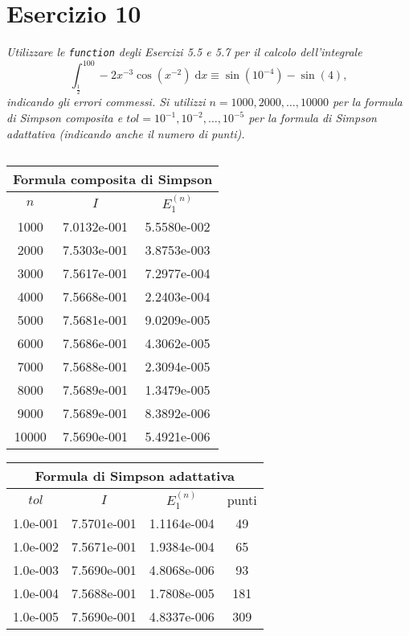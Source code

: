 
\section{Esercizio 10}
\label{sub:es10}
\emph{Utilizzare le \lstinline{function} degli Esercizi 5.5 e 5.7 per il calcolo dell'integrale
      $$\int_{\frac{1}{2}}^{100}-2x^{-3}\cos\left(x^{-2}\right)\;\mathrm{d}x\equiv\sin\left(10^{-4}\right)-\sin(4),$$
			indicando gli errori commessi.
      Si utilizzi $n=1000,2000,\dots,10000$ per la formula di Simpson composita e
      $tol=10^{-1},10^{-2},\dots,10^{-5}$ per la formula di Simpson adattativa (indicando anche il numero di punti).}
\begin{sol}
	
	\normalfont
	$ $\\
	\begin{center}\begin{tabular}{c|c|c}
	\hline\multicolumn{3}{c}{Formula composita di Simpson}\\\hline
	$n$ & $I$ & $E_1^{(n)}$\\\hline
	1000 	  &7.0132e-001 	  &5.5580e-002\\
	2000 	  &7.5303e-001 	  &3.8753e-003\\
	3000 	  &7.5617e-001 	  &7.2977e-004\\
	4000 	  &7.5668e-001 	  &2.2403e-004\\
	5000 	  &7.5681e-001 	  &9.0209e-005\\
	6000 	  &7.5686e-001 	  &4.3062e-005\\
	7000 	  &7.5688e-001 	  &2.3094e-005\\
	8000 	  &7.5689e-001 	  &1.3479e-005\\
	9000 	  &7.5689e-001 	  &8.3892e-006\\
	10000 	  &7.5690e-001 	  &5.4921e-006
	\end{tabular}\end{center}\begin{center}
	\begin{tabular}{c|c|c|c}
	\hline\multicolumn{4}{c}{Formula di Simpson adattativa}\\\hline
	$tol$ & $I$ & $E_1^{(n)}$ & punti\\\hline
	1.0e-001 	  &7.5701e-001 	  &1.1164e-004 	  &49\\
	1.0e-002 	  &7.5671e-001 	  &1.9384e-004 	  &65\\
	1.0e-003 	  &7.5690e-001 	  &4.8068e-006 	  &93\\
	1.0e-004 	  &7.5688e-001 	  &1.7808e-005 	  &181\\
	1.0e-005 	  &7.5690e-001 	  &4.8337e-006 	  &309
	\end{tabular}\end{center}
\end{sol}
